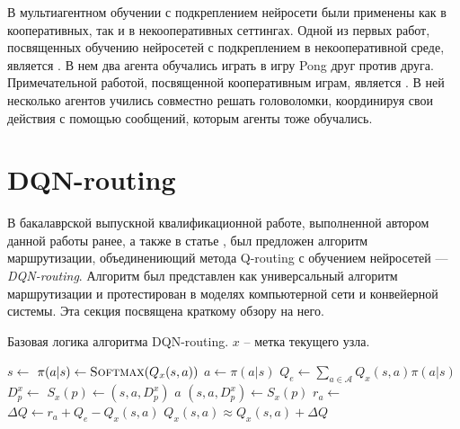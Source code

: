 \documentclass[specification,annotation,times]{itmo-student-thesis}
\theoremstyle{definition}
\begin{document}
В мультиагентном обучении с подкреплением нейросети были применены как в
кооперативных, так и в некооперативных сеттингах. Одной из первых работ,
посвященных обучению нейросетей с подкреплением в некооперативной среде,
является \cite{tampuu2017multiagent}. В нем два агента обучались играть в игру
Pong друг против друга. Примечательной работой, посвященной кооперативным играм,
является \cite{foerster2016learning}. В ней несколько агентов учились совместно
решать головоломки, координируя свои действия с помощью сообщений, которым
агенты тоже обучались.

\section{DQN-routing}\label{overview:dqn-routing}

В бакалаврской выпускной квалификационной работе, выполненной автором данной
работы ранее, а также в статье \cite{mukhutdinov2019multi}, был
предложен алгоритм маршрутизации, объединениющий метода Q-routing с обучением
нейросетей --- \textit{DQN-routing}. Алгоритм был представлен как универсальный
алгоритм маршрутизации и протестирован в моделях компьютерной сети и конвейерной
системы. Эта секция посвящена краткому обзору на него.

\begin{algorithm}[!h]
\caption{Базовая логика алгоритма DQN-routing. $x$ -- метка текущего узла.}
\label{dqnr-pseudocode}
\begin{algorithmic}[1]
   
    \State $s \gets $ 
    \State $\pi(a | s) \gets \textsc{Softmax}(Q_x(s, a))$ 
    \State $a \gets \pi(a | s)$
    \State $Q_e \gets \sum\limits_{a \in \mathcal{A}} {Q_x(s, a) \pi(a | s)}$
    \State $D_p^x \gets $ 
    \State $S_x(p) \gets (s, a, D_p^x)$
    \State {}
    \State \Return $a$ 
  \EndFunction
  \Statex
    \State $(s, a, D_p^x) \gets S_x(p)$
    \State $r_a \gets $ 
    \State $\Delta Q \gets r_a + Q_e - Q_x(s, a)$
    \State $Q_x(s, a) \approx Q_x(s, a) + \Delta Q$ 
  \EndProcedure
\end{algorithmic}
\end{algorithm}
\end{document}
